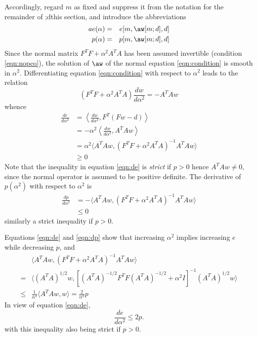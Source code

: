Accordingly, regard $m$ as fixed and suppress it from the notation for the remainder of ;dthis section, and introduce the abbreviations
\begin{eqnarray}
\label{eqn:erralph}a
e(\alpha) &=& e[m,\aw[m;d],d]\\
\label{eqn:penalph}
p(\alpha) &=& p[m,\aw[m;d],d]
\end{eqnarray}
Since the normal matrix $F^T F + \alpha^2 A^T A$ has been assumed
invertible (condition \ref{eqn:nopco}), the solution of $\aw$ of the
normal equation \ref{eqn:condition} is smooth in $\alpha^2$.
Differentiating equation \ref{eqn:condition} with respect to  $\alpha^2$ leads to the relation
\begin{equation}
(F^T F + \alpha^2 A^T A ) \frac{dw}{d\alpha^2} = -A^T A w
\label{eqn:dnorm}
\end{equation}
whence
\begin{align}
\frac{de}{d\alpha^2} 
&=\left\langle\frac{dw}{d\alpha^2},F^T(Fw-d) \right\rangle \nonumber \\
&=-\alpha^2\left\langle\frac{dw}{d\alpha^2},A^TAw\right\rangle \nonumber \\ 
&=\alpha^2 \langle A^TAw,(F^TF + \alpha^2 A^TA)^{-1}A^TAw\rangle \nonumber \\
&\ge 0
\label{eqn:de}
\end{align}
Note that the inequality in equation \ref{eqn:de} is {\em strict}  if $p > 0$ hence $A^TAw \ne 0$, since the normal operator is assumed to be positive definite.
The derivative of $p(\alpha^2)$ with respect to $\alpha^2$ is
\begin{align}
\frac{dp}{d\alpha^2} &=  -\langle A^T Aw,(F^TF + \alpha^2 A^TA)^{-1}A^TAw \rangle \nonumber \\
&\leq 0
\label{eqn:dp}
\end{align}
similarly a strict inequality if $p > 0$.

Equations \ref{eqn:de} and \ref{eqn:dp} show that increasing $\alpha^2$ implies increasing $e$ while decreasing $p$, and
\begin{align}
&\langle A^TA w,(F^TF + \alpha^2 A^TA)^{-1} A^TA w \rangle \nonumber \\ 
=& \langle (A^TA)^{1/2}w,[(A^TA)^{-1/2}F^TF(A^TA)^{-1/2} + \alpha^2 I]^{-1}(A^TA)^{1/2}w \rangle \nonumber \\ 
\le& \frac{1}{\alpha^2} \langle A^TA w, w\rangle = \frac{2}{\alpha^2}p
\end{align}
In view of equation \ref{eqn:de},
\begin{equation}
\label{eqn:lep}
\frac{de}{d\alpha^2}  \le 2p.
\end{equation}
with this inequality also being strict if $p > 0$.

